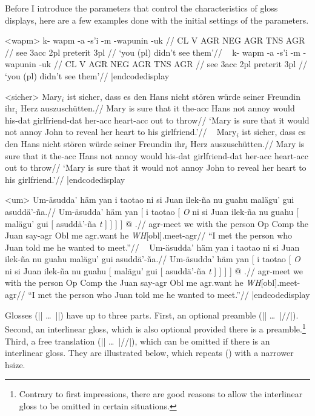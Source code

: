 %
Before I introduce the parameters that control the
characteristics of gloss displays, here are a few examples done
with the initial settings of the parameters.

\medskip
\framedisplay
\ex<wapm>
\begingl
\gla k- wapm -a -s'i -m -wapunin -uk //
\glb CL V AGR NEG AGR TNS AGR //
 see {\sc 3acc} {} {\sc 2pl} preterit {\sc 3pl} //
\glft `you (pl) didn't see them'//
\endgl
\xe
\endframedisplay
\codedisplay~
\ex
\begingl
\gla k- wapm -a -s'i -m -wapunin -uk //
\glb CL V AGR NEG AGR TNS AGR //
 see {\sc 3acc} {} {\sc 2pl} preterit {\sc 3pl} //
\glft `you (pl) didn't see them'//
\endgl
\xe
|endcodedisplay

\framedisplay
\ex<sicher>
\begingl
\gla Mary$_i$ ist sicher, dass es den Hans nicht st\"oren w\"urde
seiner Freundin ihr$_i$ Herz auszusch\"utten.//
\glb Mary is sure that it the-{\sc acc} Hans not annoy would
his-{\sc dat} girlfriend-{\sc dat} her-{\sc acc} heart-{\sc acc} {out to
throw}//
\glft  `Mary is sure that it would not annoy John to reveal her
heart to his girlfriend.'//
\endgl
\xe
\endframedisplay
\codedisplay~
\ex
\begingl
\gla Mary$_i$ ist sicher, dass es den Hans nicht st\"oren w\"urde
seiner Freundin ihr$_i$ Herz auszusch\"utten.//
\glb Mary is sure that it the-{\sc acc} Hans not annoy would
his-{\sc dat} girlfriend-{\sc dat} her-{\sc acc}
heart-{\sc acc} {out to throw}//
\glft  `Mary is sure that it would not annoy John to reveal her
heart to his girlfriend.'//
\endgl
\xe
|endcodedisplay


\framedisplay
\ex<um>
\begingl
\glpreamble Um-\"asudda' h\"am yan i taotao ni si Juan
ilek-\~na nu guahu mal\"agu' gui
asudd\"a'-\~na.//
\gla Um-\"asudda' h\"am yan [ i taotao [ {\it O\/} ni si Juan
ilek-\~na nu guahu [ mal\"agu' gui [ asudd\"a'-\~na {\it
t\/} ] ] ] ] @ .//
\glb agr-meet we with the person Op Comp the Juan say-agr Obl me
agr.want he {\it WH\/}[obl].meet-agr//
\glft ``I met the person who Juan told me he wanted to
meet.''//
\endgl
\xe
\endframedisplay
\codedisplay~
\ex
\begingl
\glpreamble Um-\"asudda' h\"am yan i taotao ni si Juan
   ilek-\~na nu guahu mal\"agu' gui asudd\"a'-\~na.//
\gla Um-\"asudda' h\"am yan [ i taotao [ {\it O\/} ni si Juan
   ilek-\~na nu guahu [ mal\"agu' gui [ asudd\"a'-\~na {\it
   t\/} ] ] ] ] @ .//
\glb agr-meet we with the person Op Comp the Juan say-agr Obl me
   agr.want he {\it WH\/}[obl].meet-agr//
\glft ``I met the person who Juan told me he wanted to
   meet.''//
\endgl
\xe
|endcodedisplay

Glosses (|\begingl| \dots\ |\endgl|) have up to three
parts.  First, an optional preamble (|\glpreamble| \dots\ |//|).
Second, an interlinear gloss, which is also optional provided there is
a preamble.\footnote{%
Contrary to first impressions, there are good reasons to allow the
interlinear gloss to be omitted in certain situations.}  Third, a free
translation (|\glft| \dots\ |//|), which can be omitted if there is an
interlinear gloss. They are illustrated below, which repeats (\lastx)
with a narrower hsize.

